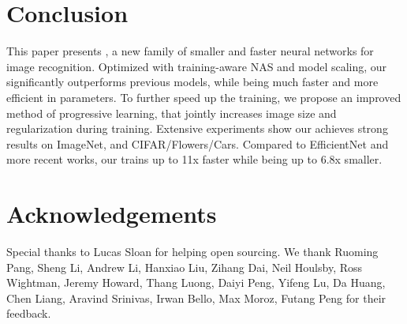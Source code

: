 \documentclass{article}
\begin{document}
\section{Conclusion}
\label{sec:conclude}
This paper presents {\xnet}, a new family of smaller and faster neural networks for image recognition. Optimized with training-aware NAS and model scaling, our {\xnet} significantly outperforms previous models, while being much faster and more efficient in parameters. To further speed up the training, we propose an improved method of progressive learning, that jointly increases image size and regularization during training. Extensive experiments show our {\xnet} achieves strong results on ImageNet, and CIFAR/Flowers/Cars. Compared to EfficientNet and more recent works, our {\xnet}  trains up to 11x faster while being up to 6.8x smaller. \section*{Acknowledgements} Special thanks to Lucas Sloan for helping open sourcing. We thank Ruoming Pang, Sheng Li, Andrew Li, Hanxiao Liu, Zihang Dai, Neil Houlsby, Ross Wightman, Jeremy Howard, Thang Luong, Daiyi Peng, Yifeng Lu, Da Huang, Chen Liang, Aravind Srinivas, Irwan Bello,  Max Moroz, Futang Peng for their feedback.



\end{document}
